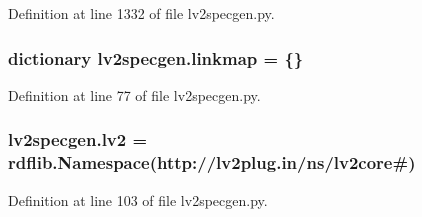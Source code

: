Definition at line 1332 of file lv2specgen.\+py.

\subsubsection[{\texorpdfstring{linkmap}{linkmap}}]{\setlength{\rightskip}{0pt plus 5cm}dictionary lv2specgen.\+linkmap = \{\}}\hypertarget{namespacelv2specgen_a01f03a9d65450e10e7543a0f30e52664}{}\label{namespacelv2specgen_a01f03a9d65450e10e7543a0f30e52664}


Definition at line 77 of file lv2specgen.\+py.

\subsubsection[{\texorpdfstring{lv2}{lv2}}]{\setlength{\rightskip}{0pt plus 5cm}lv2specgen.\+lv2 = rdflib.\+Namespace(\textquotesingle{}http\+://{\bf lv2plug.\+in}/{\bf ns}/lv2core\#\textquotesingle{})}\hypertarget{namespacelv2specgen_a38ea88c9c510b7121393afe2a23c02bc}{}\label{namespacelv2specgen_a38ea88c9c510b7121393afe2a23c02bc}


Definition at line 103 of file lv2specgen.\+py.


